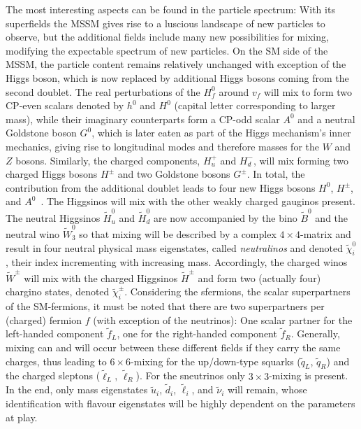\noindent The most interesting aspects can be found in the particle spectrum:
With its superfields the MSSM gives rise to a luscious landscape of new particles to observe, but the additional fields include many new possibilities for mixing, modifying the expectable spectrum of new particles.
On the SM side of the MSSM, the particle content remains relatively unchanged with exception of the Higgs boson, which is now replaced by additional Higgs bosons coming from the second doublet. The real perturbations of the $H^0_f$ around $v_f$ will mix to form two CP-even scalars denoted by $h^0$ and $H^0$ (capital letter corresponding to larger mass), while their imaginary counterparts form a CP-odd scalar $A^0$ and a neutral Goldstone boson $G^0$, which is later eaten as part of the Higgs mechanism's inner mechanics, giving rise to longitudinal modes and therefore masses for the $W$ and $Z$ bosons. Similarly, the charged components, $H^+_u$ and $H^-_d$, will mix forming two charged Higgs bosons $H^\pm$ and two Goldstone bosons $G^\pm$. In total, the contribution from the additional doublet leads to four new Higgs bosons $H^0$, $H^\pm$, and $A^0$~\cite{higgs, peskin, primer}.
The Higgsinos will mix with the other weakly charged gauginos present.
The neutral Higgsinos $\tilde{H}^0_u$ and $\tilde{H}^0_d$ are now accompanied by the bino $\tilde{B}^0$ and the neutral wino $\tilde{W}^0_3$ so that mixing will be described by a complex \mbox{$4\!\times\!4$}-matrix and result in four neutral physical mass eigenstates, called \textit{neutralinos} and denoted $\tilde{\chi}^0_i$, their index incrementing with increasing mass. Accordingly, the charged winos $\tilde{W}^\pm$ will mix with the charged Higgsinos $\tilde{H}^\pm$ and form two (actually four) chargino states, denoted $\tilde{\chi}^\pm_i$.
Considering the sfermions, the scalar superpartners of the SM-fermions, it must be noted that there are two superpartners per (charged) fermion $f$ (with exception of the neutrinos): One scalar partner for the left-handed component $\tilde{f}_L$, one for the right-handed component $\tilde{f}_R$. Generally, mixing can and will occur between these different fields if they carry the same charges, thus leading to \mbox{$6\!\times\!6$}-mixing for the up/down-type squarks ($\tilde{q}_L$, $\tilde{q}_R$) and the charged sleptons ($\tilde{\ell}_L$, $\tilde{\ell}_R$). For the sneutrinos only \mbox{$3\!\times\!3$}-mixing is present. In the end, only mass eigenstates $\tilde{u}_i$, $\tilde{d}_i$, $\tilde{\ell}_i$, and $\tilde{\nu}_i$ will remain, whose identification with flavour eigenstates will be highly dependent on the parameters at play.
